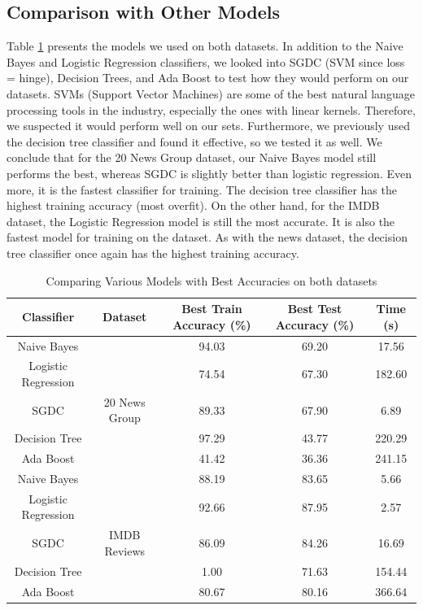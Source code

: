\documentclass[11pt]{homework}
\begin{document}
\subsection{Comparison with Other Models}
Table \ref{table-models} presents the models we used on both datasets. In addition to the Naive Bayes and Logistic Regression classifiers, we looked into SGDC (SVM since loss = hinge), Decision Trees, and Ada Boost to test how they would perform on our datasets. SVMs (Support Vector Machines) are some of the best natural language processing tools in the industry, especially the ones with linear kernels. Therefore, we suspected it would perform well on our sets. Furthermore, we previously used the decision tree classifier and found it effective, so we tested it as well. We conclude that for the 20 News Group dataset, our Naive Bayes model still performs the best, whereas SGDC is slightly better than logistic regression. Even more, it is the fastest classifier for training. The decision tree classifier has the highest training accuracy (most overfit). On the other hand, for the IMDB dataset, the Logistic Regression model is still the most accurate. It is also the fastest model for training on the dataset. As with the news dataset, the decision tree classifier once again has the highest training accuracy. 


\begin{table}[h!] 
\centering
\begin{tabular}{||c c c c c||} 
 \hline
 Classifier & Dataset & Best Train Accuracy (\%) & Best Test Accuracy (\%) & Time (s)\\ [0.5ex] 
 \hline\hline
 \rowcolor{lightgray}Naive Bayes && 94.03 & 69.20 & 17.56 \\ 
 Logistic Regression && 74.54 & 67.30 & 182.60 \\
 SGDC & 20 News Group & 89.33 & 67.90 & 6.89 \\
 Decision Tree && 97.29 & 43.77 & 220.29 \\
  Ada Boost && 41.42 & 36.36 & 241.15\\
 \hline \hline
 Naive Bayes && 88.19 & 83.65 & 5.66 \\
\rowcolor{lightgray}Logistic Regression && 92.66 & 87.95 & 2.57 \\
 SGDC & IMDB Reviews & 86.09 & 84.26 & 16.69 \\
 Decision Tree && 1.00 & 71.63 & 154.44 \\
 Ada Boost && 80.67 & 80.16 & 366.64 \\[1ex] 
 \hline
\end{tabular}
\caption{Comparing Various Models with Best Accuracies on both datasets}
\label{table-models}
\end{table}
\end{document}
